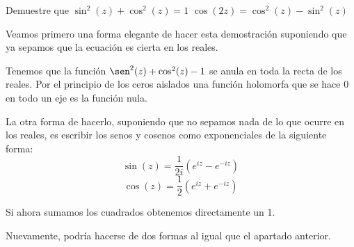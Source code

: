 \begin{problem}[8]
Demuestre que
\ppart $\sin^2(z)+\cos^2(z) = 1$
\ppart $\cos(2z)=\cos^2(z)-\sin^2(z)$
\solution

\spart
Veamos primero una forma elegante de hacer esta demostración suponiendo que ya sepamos que la ecuación es cierta en los reales.

Tenemos que la función $\sen^2(z)+\cos^2(z)-1$ se anula en toda la recta de los reales. Por el principio de los ceros aislados una función holomorfa que se hace 0 en todo un eje es la función nula.

La otra forma de hacerlo, suponiendo que no sepamos nada de lo que ocurre en los reales, es escribir los senos y cosenos como exponenciales de la siguiente forma:
\[\sin(z)=\frac{1}{2i}\left( e^{iz}-e^{-iz}\right)\]
\[\cos(z)=\frac{1}{2}\left( e^{iz}+e^{-iz}\right)\]

Si ahora sumamos los cuadrados obtenemos directamente un 1.

\spart

Nuevamente, podría hacerse de dos formas al igual que el apartado anterior.

\end{problem}

